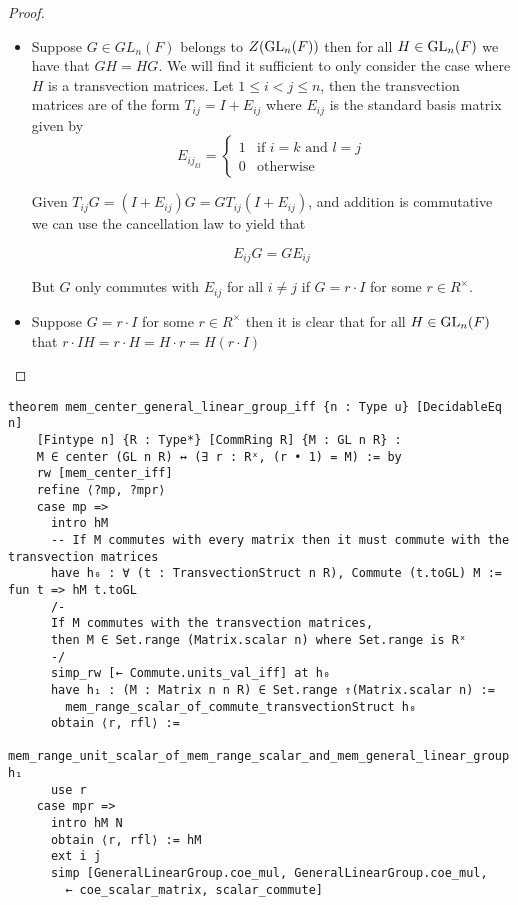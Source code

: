     \begin{proof}
        \leanok
        \begin{itemize}
        \item Suppose $G \in GL_n(F)$ belongs to $Z(\operatorname{GL}_n(F))$ then for all $H \in \operatorname{GL}_n(F)$ we have that $G H = H G$. We will find it sufficient to only consider the case where $H$ is a transvection matrices.
        Let $1 \leq i < j \leq n$, then the transvection matrices are of the form $T_{ij} = I + E_{ij}$ where $E_{ij}$ is the standard basis matrix given by
        \[
        E_{{ij}_{kl}} = \begin{cases}
        1 & \text{if $i = k$ and $l = j$}\\
        0 & \text{otherwise}
        \end{cases}
        \] 
    
        Given $T_{ij} G = (I + E_{ij}) G = G T_{ij} (I + E_{ij})$, and addition is commutative we can use the cancellation law to yield that
        
        \[
        E_{ij} G = G E_{ij}
        \]
    
        But $G$ only commutes with $E_{ij}$ for all $i \neq j$ if $G = r \cdot I$ for some $r \in R^\times$.
        
        \item Suppose $G = r \cdot I$ for some $r \in R^\times$ then it is clear that for all $H \in \operatorname{GL}_n(F)$ that $r \cdot I  H = r \cdot H = H \cdot r = H (r \cdot I)$
        \end{itemize}
    \end{proof}
\begin{footnotesize}
\begin{verbatim}
theorem mem_center_general_linear_group_iff {n : Type u} [DecidableEq n]
    [Fintype n] {R : Type*} [CommRing R] {M : GL n R} :
    M ∈ center (GL n R) ↔ (∃ r : Rˣ, (r • 1) = M) := by
    rw [mem_center_iff]
    refine ⟨?mp, ?mpr⟩
    case mp =>
      intro hM
      -- If M commutes with every matrix then it must commute with the transvection matrices
      have h₀ : ∀ (t : TransvectionStruct n R), Commute (t.toGL) M := fun t => hM t.toGL
      /-
      If M commutes with the transvection matrices,
      then M ∈ Set.range (Matrix.scalar n) where Set.range is Rˣ
      -/
      simp_rw [← Commute.units_val_iff] at h₀
      have h₁ : (M : Matrix n n R) ∈ Set.range ⇑(Matrix.scalar n) :=
        mem_range_scalar_of_commute_transvectionStruct h₀
      obtain ⟨r, rfl⟩ :=
        mem_range_unit_scalar_of_mem_range_scalar_and_mem_general_linear_group h₁
      use r
    case mpr =>
      intro hM N
      obtain ⟨r, rfl⟩ := hM
      ext i j
      simp [GeneralLinearGroup.coe_mul, GeneralLinearGroup.coe_mul,
        ← coe_scalar_matrix, scalar_commute]
\end{verbatim}
\end{footnotesize}

